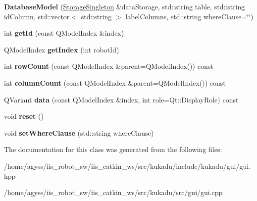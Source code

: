 \begin{DoxyCompactItemize}
\item 
{\bfseries Database\+Model} (\hyperlink{classkukadu_1_1StorageSingleton}{Storage\+Singleton} \&data\+Storage, std\+::string table, std\+::string id\+Column, std\+::vector$<$ std\+::string $>$ label\+Columns, std\+::string where\+Clause=\char`\"{}\char`\"{})\hypertarget{classkukadu_1_1DatabaseModel_a7f723ce37b2c685b777d40badff37226}{}\label{classkukadu_1_1DatabaseModel_a7f723ce37b2c685b777d40badff37226}

\item 
int {\bfseries get\+Id} (const Q\+Model\+Index \&index)\hypertarget{classkukadu_1_1DatabaseModel_a5e2c497e8c950e0a39c93b8dded3139f}{}\label{classkukadu_1_1DatabaseModel_a5e2c497e8c950e0a39c93b8dded3139f}

\item 
Q\+Model\+Index {\bfseries get\+Index} (int robot\+Id)\hypertarget{classkukadu_1_1DatabaseModel_a5ff48b1c45dfd91e042f3bb69b7029a7}{}\label{classkukadu_1_1DatabaseModel_a5ff48b1c45dfd91e042f3bb69b7029a7}

\item 
int {\bfseries row\+Count} (const Q\+Model\+Index \&parent=Q\+Model\+Index()) const \hypertarget{classkukadu_1_1DatabaseModel_ab81d6fa574db34fe9740f00aaf4abd39}{}\label{classkukadu_1_1DatabaseModel_ab81d6fa574db34fe9740f00aaf4abd39}

\item 
int {\bfseries column\+Count} (const Q\+Model\+Index \&parent=Q\+Model\+Index()) const \hypertarget{classkukadu_1_1DatabaseModel_a62f5000d5e96689e8a32ef39355f7d79}{}\label{classkukadu_1_1DatabaseModel_a62f5000d5e96689e8a32ef39355f7d79}

\item 
Q\+Variant {\bfseries data} (const Q\+Model\+Index \&index, int role=Qt\+::\+Display\+Role) const \hypertarget{classkukadu_1_1DatabaseModel_a4a7853a594cc2f9eefc0f34d9fb77a4a}{}\label{classkukadu_1_1DatabaseModel_a4a7853a594cc2f9eefc0f34d9fb77a4a}

\item 
void {\bfseries reset} ()\hypertarget{classkukadu_1_1DatabaseModel_ac624f0cf5c64a935c69f05d575c37c2c}{}\label{classkukadu_1_1DatabaseModel_ac624f0cf5c64a935c69f05d575c37c2c}

\item 
void {\bfseries set\+Where\+Clause} (std\+::string where\+Clause)\hypertarget{classkukadu_1_1DatabaseModel_abc9aa84b372953370b890e3adb68c945}{}\label{classkukadu_1_1DatabaseModel_abc9aa84b372953370b890e3adb68c945}

\end{DoxyCompactItemize}


The documentation for this class was generated from the following files\+:\begin{DoxyCompactItemize}
\item 
/home/agyss/iis\+\_\+robot\+\_\+sw/iis\+\_\+catkin\+\_\+ws/src/kukadu/include/kukadu/gui/gui.\+hpp\item 
/home/agyss/iis\+\_\+robot\+\_\+sw/iis\+\_\+catkin\+\_\+ws/src/kukadu/src/gui/gui.\+cpp\end{DoxyCompactItemize}
